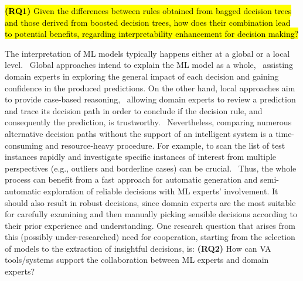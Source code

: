 %
%
\hl{\textbf{(RQ1)} Given the differences between rules obtained from bagged decision trees and those derived from boosted decision trees, how does their combination lead to potential benefits, regarding interpretability enhancement for decision making?}
%

The interpretation of ML models typically happens either at a global or a local level.~\cite{Kopitar2019Local}
Global approaches intend to explain the ML model as a whole,~\cite{Lipton2018The} assisting domain experts in exploring the general impact of each decision and gaining confidence in the produced predictions. 
% 
On the other hand, local approaches aim to provide case-based reasoning,~\cite{Du2019Techniques,Carvalho2019Machine} allowing domain experts to review a prediction and trace its decision path in order to conclude if the decision rule, and consequently the prediction, is trustworthy.~\cite{Weller2019Transparency} 
%
Nevertheless, comparing numerous alternative decision paths without the support of an intelligent system is a time-consuming and resource-heavy procedure. For example, to scan the list of test instances rapidly and investigate specific instances of interest from multiple perspectives (e.g., outliers and borderline cases) can be crucial.~\cite{Kim2014The} Thus, the whole process can benefit from a fast approach for automatic generation and semi-automatic exploration of reliable decisions with ML experts' involvement.
It should also result in robust decisions, since domain experts are the most suitable for carefully examining and then manually picking sensible decisions according to their prior experience and understanding. One research question that arises from this (possibly under-researched) need for cooperation, starting from the selection of models to the extraction of insightful decisions, is: \textbf{(RQ2)} How can VA tools/systems support the collaboration between ML experts and domain experts?

